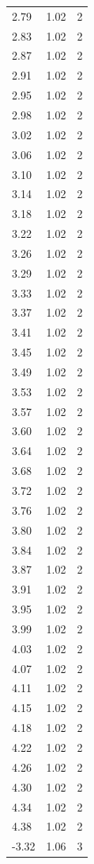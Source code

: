 \begin{longtable}{lrr}
  2.79 & 1.02 & 2 \\
  2.83 & 1.02 & 2 \\
  2.87 & 1.02 & 2 \\
  2.91 & 1.02 & 2 \\
  2.95 & 1.02 & 2 \\
  2.98 & 1.02 & 2 \\
  3.02 & 1.02 & 2 \\
  3.06 & 1.02 & 2 \\
  3.10 & 1.02 & 2 \\
  3.14 & 1.02 & 2 \\
  3.18 & 1.02 & 2 \\
  3.22 & 1.02 & 2 \\
  3.26 & 1.02 & 2 \\
  3.29 & 1.02 & 2 \\
  3.33 & 1.02 & 2 \\
  3.37 & 1.02 & 2 \\
  3.41 & 1.02 & 2 \\
  3.45 & 1.02 & 2 \\
  3.49 & 1.02 & 2 \\
  3.53 & 1.02 & 2 \\
  3.57 & 1.02 & 2 \\
  3.60 & 1.02 & 2 \\
  3.64 & 1.02 & 2 \\
  3.68 & 1.02 & 2 \\
  3.72 & 1.02 & 2 \\
  3.76 & 1.02 & 2 \\
  3.80 & 1.02 & 2 \\
  3.84 & 1.02 & 2 \\
  3.87 & 1.02 & 2 \\
  3.91 & 1.02 & 2 \\
  3.95 & 1.02 & 2 \\
  3.99 & 1.02 & 2 \\
  4.03 & 1.02 & 2 \\
  4.07 & 1.02 & 2 \\
  4.11 & 1.02 & 2 \\
  4.15 & 1.02 & 2 \\
  4.18 & 1.02 & 2 \\
  4.22 & 1.02 & 2 \\
  4.26 & 1.02 & 2 \\
  4.30 & 1.02 & 2 \\
  4.34 & 1.02 & 2 \\
  4.38 & 1.02 & 2 \\
  -3.32 & 1.06 & 3 \\

\end{longtable}

